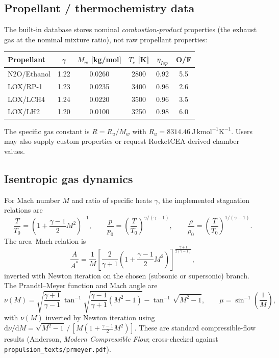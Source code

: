 \documentclass[11pt]{article}
\newcommand{\code}[1]{\texttt{#1}}
\begin{document}
\subsection{Propellant / thermochemistry data}

The built-in database stores nominal \emph{combustion-product} properties
(the exhaust gas at the nominal mixture ratio), not raw propellant
properties:

\begin{center}
\begin{tabular}{lccccc}
\toprule
\textbf{Propellant} & $\gamma$ & $M_w$ [kg/mol] & $T_c$ [K] & $\eta_{Isp}$ & O/F \\
\midrule
N2O/Ethanol & 1.22 & 0.0260 & 2800 & 0.92 & 5.5 \\
LOX/RP-1    & 1.23 & 0.0235 & 3400 & 0.96 & 2.6 \\
LOX/LCH4    & 1.24 & 0.0220 & 3500 & 0.96 & 3.5 \\
LOX/LH2     & 1.20 & 0.0100 & 3250 & 0.98 & 6.0 \\
\bottomrule
\end{tabular}
\end{center}

The specific gas constant is $R = R_u / M_w$ with
$R_u = 8314.46~\mathrm{J\,kmol^{-1}K^{-1}}$. Users may also supply custom
properties or request RocketCEA-derived chamber values.

\subsection{Isentropic gas dynamics}

For Mach number $M$ and ratio of specific heats $\gamma$, the implemented
stagnation relations are
\begin{equation}
\frac{T}{T_0}=\left(1+\frac{\gamma-1}{2}M^2\right)^{-1},
\qquad
\frac{p}{p_0}=\left(\frac{T}{T_0}\right)^{\gamma/(\gamma-1)},
\qquad
\frac{\rho}{\rho_0}=\left(\frac{T}{T_0}\right)^{1/(\gamma-1)} .
\end{equation}
The area--Mach relation is
\begin{equation}
\frac{A}{A^*}=\frac{1}{M}
\left[\frac{2}{\gamma+1}\left(1+\frac{\gamma-1}{2}M^2\right)\right]^{\frac{\gamma+1}{2(\gamma-1)}},
\end{equation}
inverted with Newton iteration on the chosen (subsonic or supersonic) branch.
The Prandtl--Meyer function and Mach angle are
\begin{equation}
\nu(M)=\sqrt{\frac{\gamma+1}{\gamma-1}}\,
\tan^{-1}\!\sqrt{\frac{\gamma-1}{\gamma+1}\left(M^2-1\right)}
-\tan^{-1}\!\sqrt{M^2-1},
\qquad
\mu=\sin^{-1}\!\left(\frac{1}{M}\right),
\end{equation}
with $\nu(M)$ inverted by Newton iteration using
$\mathrm{d}\nu/\mathrm{d}M=\sqrt{M^2-1}\,/\,[M(1+\tfrac{\gamma-1}{2}M^2)]$.
These are standard compressible-flow results (Anderson, \emph{Modern
Compressible Flow}; cross-checked against \code{propulsion\_texts/prmeyer.pdf}).
\end{document}

